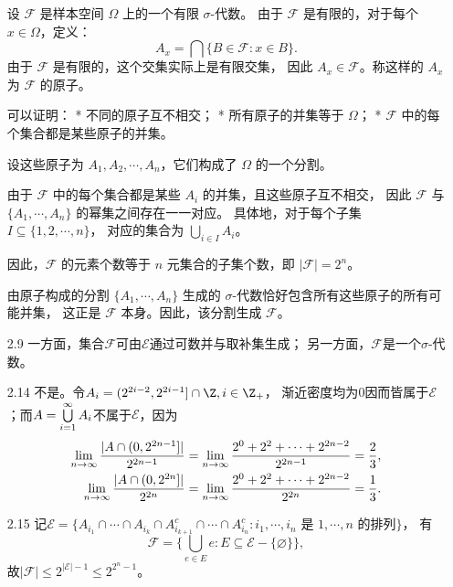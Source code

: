 \begin{itemize}
    设 $\mathcal{F}$ 是样本空间 $\Omega$ 上的一个有限 $\sigma$-代数。
    由于 $\mathcal{F}$ 是有限的，对于每个 $x \in \Omega$，定义：
    $$A_x = \bigcap \{B \in \mathcal{F}: x \in B\}.$$
    由于 $\mathcal{F}$ 是有限的，这个交集实际上是有限交集，
    因此 $A_x \in \mathcal{F}$。称这样的 $A_x$ 为 $\mathcal{F}$ 的原子。

    可以证明：
    * 不同的原子互不相交；
    * 所有原子的并集等于 $\Omega$；
    * $\mathcal{F}$ 中的每个集合都是某些原子的并集。

    设这些原子为 $A_1, A_2, \cdots, A_n$，它们构成了 $\Omega$ 的一个分割。

    由于 $\mathcal{F}$ 中的每个集合都是某些 $A_i$ 的并集，且这些原子互不相交，
    因此 $\mathcal{F}$ 与 $\{A_1, \cdots, A_n\}$ 的幂集之间存在一一对应。
    具体地，对于每个子集 $I \subseteq \{1,2,\cdots,n\}$，
    对应的集合为 $\bigcup\limits_{i \in I} A_i$。

    因此，$\mathcal{F}$ 的元素个数等于 $n$ 元集合的子集个数，即 $|\mathcal{F}| = 2^n$。

    由原子构成的分割 $\{A_1, \cdots, A_n\}$ 生成的 $\sigma$-代数恰好包含所有这些原子的所有可能并集，
    这正是 $\mathcal{F}$ 本身。因此，该分割生成 $\mathcal{F}$。


    \item[2.9]
    一方面，集合$\mathcal{F}$可由$\mathcal{E}$通过可数并与取补集生成；
    另一方面，$\mathcal{F}$是一个$\sigma$-代数。

    \item[2.14]
    不是。令$A_i=(2^{2i-2},2^{2i-1}]\cap\Z,i\in\Z_+$，
    渐近密度均为$0$因而皆属于$\mathcal{E}$；而$A=\bigcup\limits_{i=1}^\infty A_i$不属于$\mathcal{E}$，因为
    \begin{align*}\lim\limits_{n\to\infty}\frac{|A\cap(0,2^{2n-1}]|}{2^{2n-1}}
    &=\lim\limits_{n\to\infty}\frac{2^0+2^2+\cdots+2^{2n-2}}{2^{2n-1}}=\frac{2}{3},\\
    \lim\limits_{n\to\infty}\frac{|A\cap(0,2^{2n}]|}{2^{2n}}
    &=\lim\limits_{n\to\infty}\frac{2^0+2^2+\cdots+2^{2n-2}}{2^{2n}}=\frac{1}{3}.\end{align*}

    \item[2.15]
    记$\mathcal{E}=\{A_{i_1}\cap\cdots\cap 
    A_{i_k}\cap A^c_{i_{k+1}}\cap\cdots\cap A^c_{i_n}:
    i_1,\cdots,i_n\text{ 是 }1,\cdots,n\text{ 的排列}\}$，
    有$$\mathcal{F}=\Big\{\bigcup\limits_{e\in E}e:
    E\subseteq\mathcal{E}-\{\varnothing\}\Big\},$$
    故$|\mathcal{F}|\le 2^{|\mathcal{E}|-1}\le 2^{2^n-1}$。


\end{itemize}
